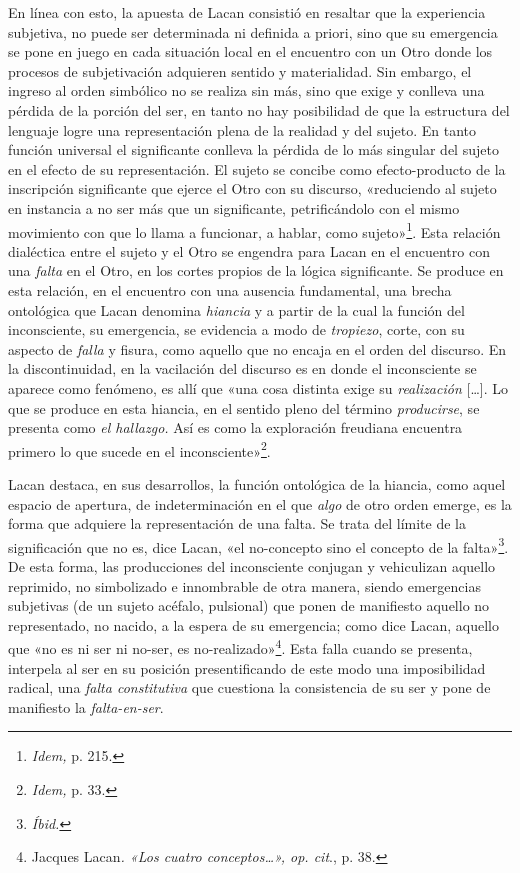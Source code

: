 En línea con esto, la apuesta de Lacan consistió en resaltar que la experiencia subjetiva, no puede ser determinada ni definida a priori, sino que su emergencia se pone en juego en cada situación local en el encuentro con un Otro donde los procesos de subjetivación adquieren sentido y materialidad. Sin embargo, el ingreso al orden simbólico no se realiza sin más, sino que exige y conlleva una pérdida de la porción del ser, en tanto no hay posibilidad de que la estructura del lenguaje logre una representación plena de la realidad y del sujeto. En tanto función universal el significante conlleva la pérdida de lo más singular del sujeto en el efecto de su representación. El sujeto se concibe como efecto-producto de la inscripción significante que ejerce el Otro con su discurso, «reduciendo al sujeto en instancia a no ser más que un significante, petrificándolo con el mismo movimiento con que lo llama a funcionar, a hablar, como sujeto»\footnote{\emph{Idem,} p. 215.}. Esta relación dialéctica entre el sujeto y el Otro se engendra para Lacan en el encuentro con una \emph{falta} en el Otro, en los cortes propios de la lógica significante. Se produce en esta relación, en el encuentro con una ausencia fundamental, una brecha ontológica que Lacan denomina \emph{hiancia} y a partir de la cual la función del inconsciente, su emergencia, se evidencia a modo de \emph{tropiezo}, corte, con su aspecto de \emph{falla} y fisura, como aquello que no encaja en el orden del discurso. En la discontinuidad, en la vacilación del discurso es en donde el inconsciente se aparece como fenómeno, es allí que «una cosa distinta exige su \emph{realización} {[}\ldots{]}. Lo que se produce en esta hiancia, en el sentido pleno del término \emph{producirse}, se presenta como \emph{el hallazgo.} Así es como la exploración freudiana encuentra primero lo que sucede en el inconsciente»\footnote{\emph{Idem,} p. 33.}.

Lacan destaca, en sus desarrollos, la función ontológica de la hiancia, como aquel espacio de apertura, de indeterminación en el que \emph{algo} de otro orden emerge, es la forma que adquiere la representación de una falta. Se trata del límite de la significación que no es, dice Lacan, «el no-concepto sino el concepto de la falta»\footnote{\emph{Íbid.}}. De esta forma, las producciones del inconsciente conjugan y vehiculizan aquello reprimido, no simbolizado e innombrable de otra manera, siendo emergencias subjetivas (de un sujeto acéfalo, pulsional) que ponen de manifiesto aquello no representado, no nacido, a la espera de su emergencia; como dice Lacan, aquello que «no es ni ser ni no-ser, es no-realizado»\footnote{Jacques Lacan\emph{. «Los cuatro conceptos\ldots», op. cit}., p. 38.}. Esta falla cuando se presenta, interpela al ser en su posición presentificando de este modo una imposibilidad radical, una \emph{falta constitutiva} que cuestiona la consistencia de su ser y pone de manifiesto la \emph{falta-en-ser}.


